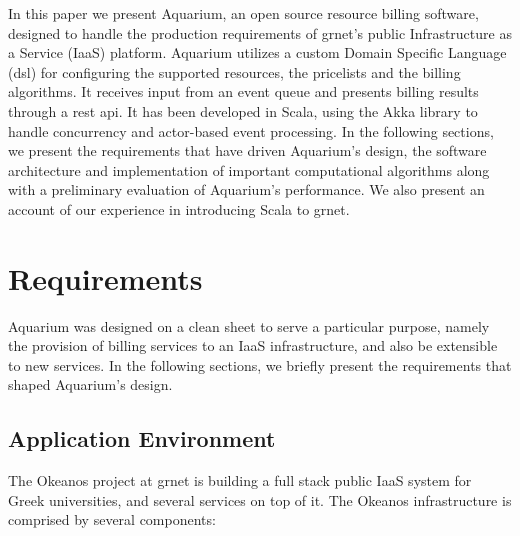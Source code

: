 \documentclass[preprint,10pt]{sigplanconf}
\begin{document}
In this paper we present Aquarium, an open source resource billing software,
designed to handle the production  requirements of {\sc grnet}'s public
Infrastructure as a Service (IaaS) platform. Aquarium utilizes a custom Domain
Specific Language ({\sc dsl}) for configuring the supported resources, the
pricelists and the billing algorithms. It receives input from an event queue
and presents billing results through a {\sc rest api}. It has been developed
in Scala, using the Akka library to handle concurrency and actor-based
event processing. In the following sections, we present the requirements
that have driven Aquarium's design, the software architecture and
implementation of important computational algorithms along with a preliminary
evaluation of Aquarium's performance. We also present an account of our
experience in introducing Scala to {\sc grnet}.

\section{Requirements}

Aquarium was designed on a clean sheet to serve a particular purpose, namely
the provision of billing services to an IaaS infrastructure, and also be
extensible to new services. In the following sections, we briefly present the
requirements that shaped Aquarium's design.

\subsection{Application Environment} The Okeanos project at {\sc grnet} is
building a full stack public IaaS system for Greek universities, and several
services on top of it. The Okeanos infrastructure is comprised by several
components:
\end{document}
